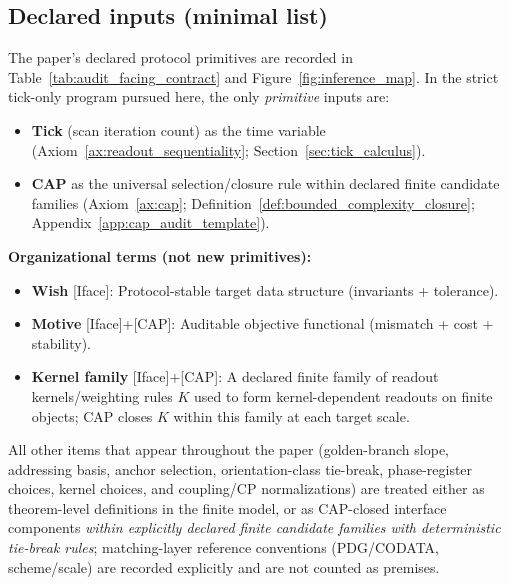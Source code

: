 \subsection{Declared inputs (minimal list)}
The paper's declared protocol primitives are recorded in Table~\ref{tab:audit_facing_contract} and Figure~\ref{fig:inference_map}.
In the strict tick-only program pursued here, the only \emph{primitive} inputs are:
\begin{itemize}
\item \textbf{Tick} (scan iteration count) as the time variable (Axiom~\ref{ax:readout_sequentiality}; Section~\ref{sec:tick_calculus}).
\item \textbf{CAP} as the universal selection/closure rule within declared finite candidate families (Axiom~\ref{ax:cap}; Definition~\ref{def:bounded_complexity_closure}; Appendix~\ref{app:cap_audit_template}).
\end{itemize}
\textbf{Organizational terms (not new primitives):}
\begin{itemize}
\item \textbf{Wish} \textsf{[Iface]}: Protocol-stable target data structure (invariants + tolerance).
\item \textbf{Motive} \textsf{[Iface]+[CAP]}: Auditable objective functional (mismatch + cost + stability).
\item \textbf{Kernel family} \textsf{[Iface]+[CAP]}: A declared finite family of readout kernels/weighting rules $K$ used to form kernel-dependent readouts on finite objects; CAP closes $K$ within this family at each target scale.
\end{itemize}
All other items that appear throughout the paper (golden-branch slope, addressing basis, anchor selection, orientation-class tie-break, phase-register choices, kernel choices, and coupling/CP normalizations) are treated either as theorem-level definitions in the finite model, or as CAP-closed interface components \emph{within explicitly declared finite candidate families with deterministic tie-break rules}; matching-layer reference conventions (PDG/CODATA, scheme/scale) are recorded explicitly and are not counted as premises.


